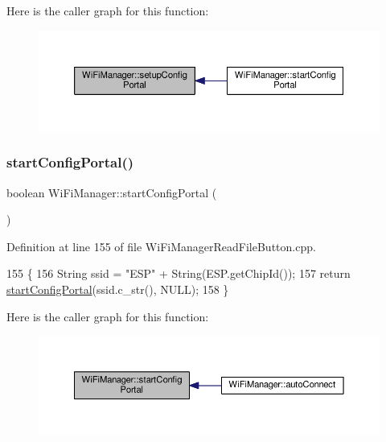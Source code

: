 Here is the caller graph for this function\+:\nopagebreak
\begin{figure}[H]
\begin{center}
\leavevmode
\includegraphics[width=350pt]{d4/dc8/class_wi_fi_manager_a1743325d0dd86d011df96b22d2a0ddd6_icgraph}
\end{center}
\end{figure}
\mbox{\label{class_wi_fi_manager_ad781751307f7f623956126096a09a545}} 
\subsubsection{\texorpdfstring{start\+Config\+Portal()}{startConfigPortal()}\hspace{0.1cm}{\footnotesize\ttfamily [1/2]}}
{\footnotesize\ttfamily boolean Wi\+Fi\+Manager\+::start\+Config\+Portal (\begin{DoxyParamCaption}{ }\end{DoxyParamCaption})}



Definition at line 155 of file Wi\+Fi\+Manager\+Read\+File\+Button.\+cpp.


\begin{DoxyCode}
155                                        \{
156   String ssid = \textcolor{stringliteral}{"ESP"} + String(ESP.getChipId());
157   \textcolor{keywordflow}{return} \hyperlink{class_wi_fi_manager_ad781751307f7f623956126096a09a545}{startConfigPortal}(ssid.c\_str(), NULL);
158 \}
\end{DoxyCode}
Here is the caller graph for this function\+:\nopagebreak
\begin{figure}[H]
\begin{center}
\leavevmode
\includegraphics[width=350pt]{d4/dc8/class_wi_fi_manager_ad781751307f7f623956126096a09a545_icgraph}
\end{center}
\end{figure}
\mbox{\label{class_wi_fi_manager_afaca5021edffb4d9a5bd39f7b0f7a686}} 
